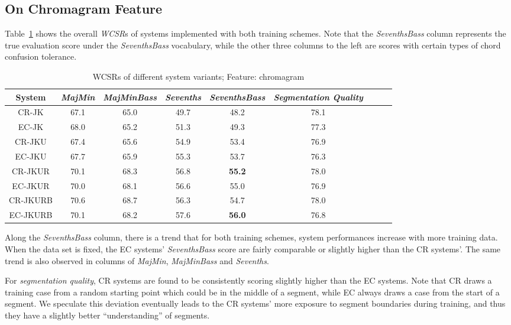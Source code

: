 \subsection{On Chromagram Feature}\label{sec:4-ch}
\label{sec:4-over-ch}
Table~\ref{tab:4-overallres} shows the overall \textit{WCSR}s of systems implemented with both training schemes. Note that the \textit{SeventhsBass} column represents the true evaluation score under the \textit{SeventhsBass} vocabulary, while the other three columns to the left are scores with certain types of chord confusion tolerance.
\begin{table}[htb]
	\caption{WCSRs of different system variants; Feature: chromagram}
	\label{tab:4-overallres}
	\centering
	\scriptsize
	\begin{tabular}{|c|c|c|c|c|c|c|c|c|}\hline
		System & \textit{MajMin} & \textit{MajMinBass} & \textit{Sevenths} & \textbf{\textit{SeventhsBass}} & \textit{Segmentation Quality}  \\ \hline
		CR-JK & 67.1 & 65.0 & 49.7 & 48.2 & 78.1 \\ \hline
		EC-JK & 68.0 & 65.2 & 51.3 & 49.3 & 77.3 \\ \hline
		CR-JKU & 67.4 & 65.6 & 54.9 & 53.4 & 76.9 \\ \hline
		EC-JKU & 67.7 & 65.9 & 55.3 & 53.7 & 76.3 \\ \hline
		CR-JKUR & 70.1 & 68.3 & 56.8 & \textbf{55.2} & 78.0 \\ \hline
		EC-JKUR & 70.0 & 68.1 & 56.6 & 55.0 & 76.9 \\ \hline
		CR-JKURB & 70.6 & 68.7 & 56.3 & 54.7 & 78.0 \\ \hline
		EC-JKURB & 70.1 & 68.2 & 57.6 & \textbf{56.0} & 76.8 \\ \hline
	\end{tabular}
\end{table}

Along the \textit{SeventhsBass} column, there is a trend that for both training schemes, system performances increase with more training data. When the data set is fixed, the EC systems' \textit{SeventhsBass} score are fairly comparable or slightly higher than the CR systems'. The same trend is also observed in columns of \textit{MajMin}, \textit{MajMinBass} and \textit{Sevenths}.

For \textit{segmentation quality}, CR systems are found to be consistently scoring slightly higher than the EC systems. Note that CR draws a training case from a random starting point which could be in the middle of a segment, while EC always draws a case from the start of a segment. We speculate this deviation eventually leads to the CR systems' more exposure to segment boundaries during training, and thus they have a slightly better ``understanding'' of segments.

